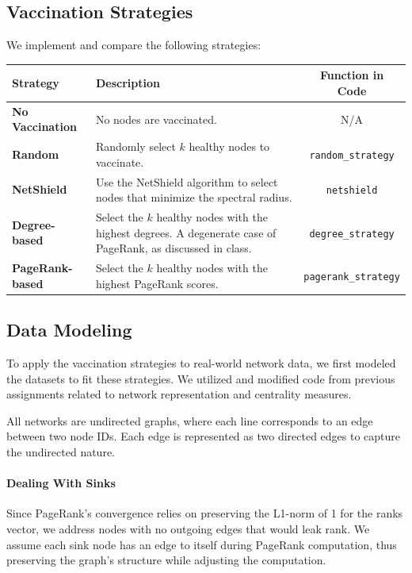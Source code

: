 \documentclass[9pt]{extarticle}
\begin{document}
\vspace{-0.3cm}
\subsection{Vaccination Strategies}
\vspace{-0.1cm}

We implement and compare the following strategies:

\vspace{-0.2cm}
\begin{table}[H]
    \centering
    \begin{tabular}{|l|p{11cm}|c|}
        \hline
        \textbf{Strategy}     & \textbf{Description} & \textbf{Function in Code}\\ \hline
        \textbf{No Vaccination} & No nodes are vaccinated. & N/A \\ \hline
        \textbf{Random}        & Randomly select $k$ healthy nodes to vaccinate. & \texttt{random\_strategy} \\ \hline
        \textbf{NetShield}     & Use the NetShield algorithm \cite{tong2010vulnerability} to select nodes that minimize the spectral radius. & \texttt{netshield} \\ \hline
        \textbf{Degree-based}  & Select the $k$ healthy nodes with the highest degrees. A degenerate case of PageRank, as discussed in class. & \texttt{degree\_strategy}\\ \hline
        \textbf{PageRank-based} & Select the $k$ healthy nodes with the highest PageRank scores. & \texttt{pagerank\_strategy} \\ \hline
    \end{tabular}
\end{table}

\subsection{Data Modeling}

To apply the vaccination strategies to real-world network data, we first modeled the datasets to fit these strategies. We utilized and modified code from previous assignments related to network representation and centrality measures.

All networks are undirected graphs, where each line corresponds to an edge between two node IDs. Each edge is represented as two directed edges to capture the undirected nature.

\paragraph{Dealing With Sinks} Since PageRank's convergence relies on preserving the L1-norm of 1 for the ranks vector, we address nodes with no outgoing edges that would leak rank. We assume each sink node has an edge to itself during PageRank computation, thus preserving the graph's structure while adjusting the computation.
\end{document}
